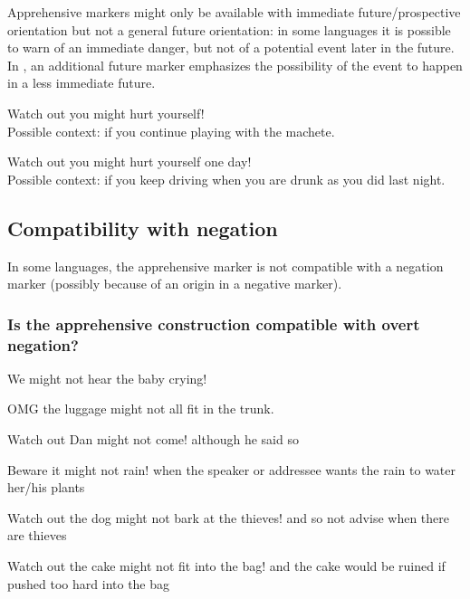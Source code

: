 \documentclass[output=paper,colorlinks,citecolor=brown]{langscibook}
\begin{document}
Apprehensive markers might only be available with immediate future/prospective orientation but not a general future orientation: in some languages it is possible to warn of an immediate danger, but not of a potential event later in the future. In  \citep[609]{epps2008}, an additional future marker emphasizes the possibility of the event to happen in a less immediate future.

\ea \label{p26} {\op}Watch out{\cp} you might hurt yourself! \\
\textnormal{Possible context: if you continue playing with the machete.}
\z

\ea \label{p27} {\op}Watch out{\cp} you might hurt yourself one day! \\
\textnormal{Possible context: if you keep driving when you are drunk as you did last night.}
\z

\subsection{Compatibility with negation}
\label{subsec:apprnegation}

In some languages, the apprehensive marker is not compatible with a negation marker (possibly because of an origin in a negative marker).

\subsubsection{Is the apprehensive construction compatible with overt negation?}
\label{1.7.1}

\ea \label{p28} We might not hear the baby crying!
\z

\ea \label{p29} {\op}OMG{\cp} the luggage might not all fit in the trunk.
\z

\ea \label{p30} {\op}Watch out{\cp} Dan might not come! {\op}\textnormal{although he said so}{\cp}
\z

\ea \label{p31} {\op}Beware{\cp} it might not rain! {\op}\textnormal{when the speaker or addressee wants the rain to water her/his plants}{\cp}
\z

\ea \label{p32} {\op}Watch out{\cp} the dog might not bark at the thieves! {\op}\textnormal{and so not advise when there are thieves}{\cp}
\z

\ea \label{p33} {\op}Watch out{\cp} the cake might not fit into the bag! {\op}\textnormal{and the cake would be ruined if pushed too hard into the bag}{\cp}
\z
\end{document}

